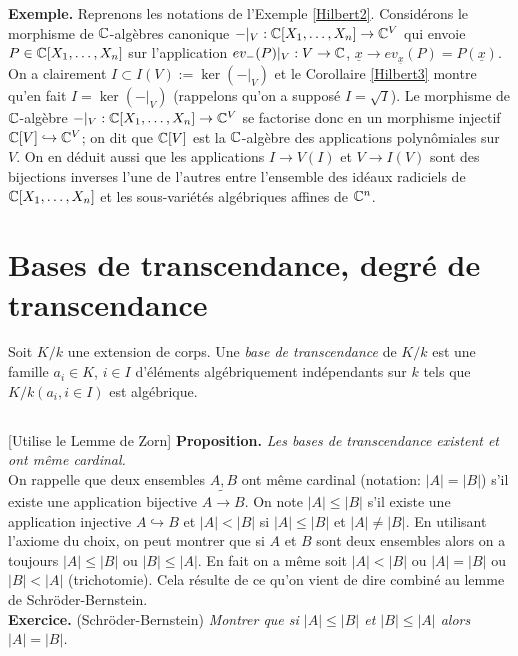  \textbf{Exemple.} Reprenons les notations de l'Exemple \ref{Hilbert2}. Considérons le morphisme de $\mathbb{C}$-algèbres canonique $-|_V:\mathbb{C}[X_1,\dots,X_n]\rightarrow \mathbb{C}^V$ qui envoie $P\in \mathbb{C}[X_1,\dots, X_n]$ sur l'application $ev_-(P)|_V:V\rightarrow \mathbb{C}$, $\underline{x}\rightarrow ev_{\underline{x}}(P)=P(\underline{x})$. On a clairement $I\subset I(V):=\ker(-|_V)$ et le Corollaire \ref{Hilbert3} montre qu'en fait $I= \ker(-|_V)$ (rappelons qu'on a supposé $I=\sqrt{I}$). Le morphisme de $\mathbb{C}$-algèbre  $-|_V:\mathbb{C}[X_1,\dots,X_n]\rightarrow \mathbb{C}^V$ se factorise donc en un morphisme injectif $\mathbb{C}[V]\hookrightarrow \mathbb{C}^V$; on dit que $\mathbb{C}[V]$ est la $\mathbb{C}$-algèbre des applications polynômiales sur $V$.  On en déduit aussi que les applications $I\rightarrow V(I)  $ et $V\rightarrow I(V)$ sont des bijections  inverses l'une de l'autres entre l'ensemble des idéaux radiciels de $\mathbb{C}[X_1,\dots, X_n]$ et les sous-variétés algébriques affines de $\mathbb{C}^n$.

 \section{Bases de transcendance, degré de transcendance}Soit $K/k$ une extension de corps. Une \textit{base de transcendance} de $K/k$ est une famille $a_i\in K$, $i\in I$ d'éléments algébriquement indépendants sur $k$ tels que $K/k(a_i,i\in I) $ est algébrique.

 \subsection{}\label{BaseTranscendance} [Utilise le Lemme de Zorn] \textbf{Proposition.} \textit{Les bases de transcendance existent et ont même cardinal.}\\

  On rappelle que deux ensembles $A,B$ ont même cardinal (notation: $|A|=|B|$) s'il existe une application bijective $A\tilde{\rightarrow}B$. On note $|A|\leq |B|$ s'il existe une application injective $A\hookrightarrow B$ et $|A|<|B|$ si $|A|\leq |B|$ et $|A|\not=|B|$. En utilisant l'axiome du choix, on peut montrer que si $A$ et $B$ sont deux ensembles alors on a toujours $|A|\leq |B|$ ou $|B|\leq |A|$. En fait on a même soit $|A|<|B|$ ou $|A|=|B|$ ou $|B|<|A|$ (trichotomie). Cela résulte de ce qu'on vient de dire combiné au lemme de Schr\"{o}der-Bernstein.\\

 \textbf{Exercice.} (Schr\"{o}der-Bernstein) \textit{Montrer que si $|A|\leq |B|$ et $|B|\leq |A|$ alors $|A|= |B|$.}



